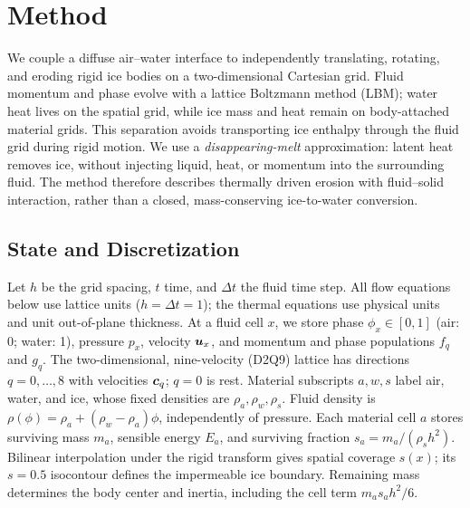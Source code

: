 \section{Method}
\label{sec:method}

We couple a diffuse air--water interface to independently translating,
rotating, and eroding rigid ice bodies on a two-dimensional Cartesian grid. Fluid momentum
and phase evolve with a lattice Boltzmann method (LBM); water heat lives on
the spatial grid, while ice mass and heat remain on body-attached material
grids. This separation avoids transporting ice enthalpy through the fluid
grid during rigid motion. We use a \emph{disappearing-melt} approximation:
latent heat removes ice, without injecting liquid, heat, or momentum into
the surrounding fluid. The method therefore describes thermally driven
erosion with fluid--solid interaction, rather than a closed, mass-conserving
ice-to-water conversion.

\subsection{State and Discretization}
\label{sec:state}
Let $h$ be the grid spacing, $t$ time, and $\Delta t$ the fluid time step. All flow
equations below use lattice units ($h=\Delta t=1$); the thermal equations
use physical units and unit out-of-plane thickness. At a fluid cell $x$,
we store phase $\phi_x\in[0,1]$ (air: 0; water: 1), pressure $p_x$,
velocity $\boldsymbol{u}_x$, and momentum and phase populations $f_q$ and $g_q$.
The two-dimensional, nine-velocity (D2Q9) lattice has directions
$q=0,\ldots,8$ with velocities $\boldsymbol{c}_q$; $q=0$ is rest.
Material subscripts $a,w,s$ label air, water, and ice, whose fixed
densities are $\rho_a,\rho_w,\rho_s$. Fluid density is
$\rho(\phi)=\rho_a+(\rho_w-\rho_a)\phi$, independently of pressure.
Each material cell $a$ stores surviving mass $m_a$, sensible energy $E_a$,
and surviving fraction $s_a=m_a/(\rho_s h^2)$. Bilinear interpolation under
the rigid transform gives spatial coverage $s(x)$; its $s=0.5$ isocontour
defines the impermeable ice boundary. Remaining mass determines the body
center and inertia, including the cell term $m_a s_a h^2/6$.

